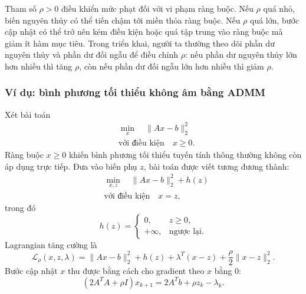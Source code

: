 Tham số $\rho>0$ điều khiển mức phạt đối với vi phạm ràng buộc. Nếu $\rho$ quá nhỏ, biến nguyên thủy có thể tiến chậm tới miền thỏa ràng buộc. Nếu $\rho$ quá lớn, bước cập nhật có thể trở nên kém điều kiện hoặc quá tập trung vào ràng buộc mà giảm ít hàm mục tiêu. Trong triển khai, người ta thường theo dõi phần dư nguyên thủy và phần dư đối ngẫu để điều chỉnh $\rho$: nếu phần dư nguyên thủy lớn hơn nhiều thì tăng $\rho$, còn nếu phần dư đối ngẫu lớn hơn nhiều thì giảm $\rho$.

\subsubsection*{Ví dụ: bình phương tối thiểu không âm bằng ADMM}
Xét bài toán
\begin{equation}
    \begin{aligned}
        &\min_x \quad \|Ax-b\|_2^2\\
        &\text{với điều kiện}\quad x\geq 0.
    \end{aligned}
    \label{eq_nnls_problem}
\end{equation}
Ràng buộc $x\geq 0$ khiến bình phương tối thiểu tuyến tính thông thường không còn áp dụng trực tiếp. Đưa vào biến phụ $z$, bài toán được viết tương đương thành:
\begin{equation}
    \begin{aligned}
        &\min_{x,z}\quad \|Ax-b\|_2^2+h(z)\\
        &\text{với điều kiện}\quad x=z,
    \end{aligned}
    \label{eq_nnls_split}
\end{equation}
trong đó
\begin{equation}
    h(z)=
    \begin{cases}
        0, & z\geq 0,\\
        +\infty, & \text{ngược lại}.
    \end{cases}
    \label{eq_indicator_nonnegative}
\end{equation}
Lagrangian tăng cường là
\begin{equation}
    \mathcal{L}_{\rho}(x,z,\lambda)
    =
    \|Ax-b\|_2^2+h(z)
    +\lambda^{T}(x-z)
    +\frac{\rho}{2}\|x-z\|_2^2.
    \label{eq_nnls_admm_lagrangian}
\end{equation}
Bước cập nhật $x$ thu được bằng cách cho gradient theo $x$ bằng $0$:
\begin{equation}
    (2A^{T}A+\rho I)x_{k+1}
    =
    2A^{T}b+\rho z_k-\lambda_k.
    \label{eq_nnls_x_update_system}
\end{equation}
